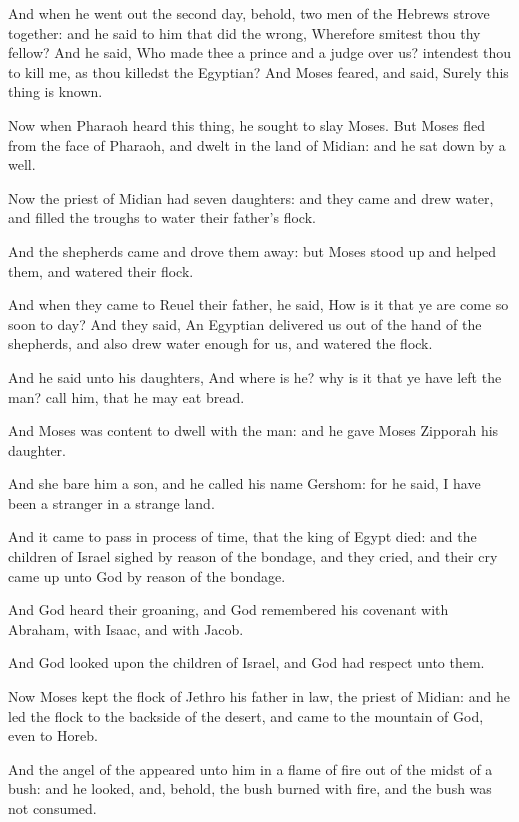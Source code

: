 \Verse And when he went out the second day, behold, two men of the Hebrews strove together: and he said to him that did the wrong, Wherefore smitest thou thy fellow?  \Verse And he said, Who made thee a prince and a judge over us? intendest thou to kill me, as thou killedst the Egyptian? And Moses feared, and said, Surely this thing is known.

\Verse Now when Pharaoh heard this thing, he sought to slay Moses. But Moses fled from the face of Pharaoh, and dwelt in the land of Midian: and he sat down by a well.

\Verse Now the priest of Midian had seven daughters: and they came and drew water, and filled the troughs to water their father's flock.

\Verse And the shepherds came and drove them away: but Moses stood up and helped them, and watered their flock.

\Verse And when they came to Reuel their father, he said, How is it that ye are come so soon to day?  \Verse And they said, An Egyptian delivered us out of the hand of the shepherds, and also drew water enough for us, and watered the flock.

\Verse And he said unto his daughters, And where is he? why is it that ye have left the man? call him, that he may eat bread.

\Verse And Moses was content to dwell with the man: and he gave Moses Zipporah his daughter.

\Verse And she bare him a son, and he called his name Gershom: for he said, I have been a stranger in a strange land.

\Verse And it came to pass in process of time, that the king of Egypt died: and the children of Israel sighed by reason of the bondage, and they cried, and their cry came up unto God by reason of the bondage.

\Verse And God heard their groaning, and God remembered his covenant with Abraham, with Isaac, and with Jacob.

\Verse And God looked upon the children of Israel, and God had respect unto them.

\Chapter
\Verse Now Moses kept the flock of Jethro his father in law, the priest of Midian: and he led the flock to the backside of the desert, and came to the mountain of God, even to Horeb.

\Verse And the angel of the \LORD appeared unto him in a flame of fire out of the midst of a bush: and he looked, and, behold, the bush burned with fire, and the bush was not consumed.

